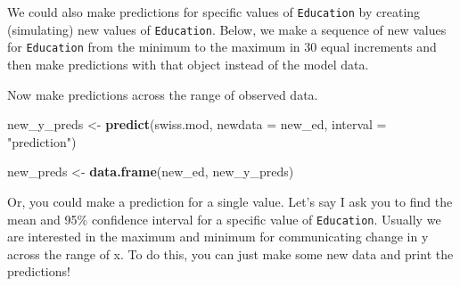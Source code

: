\documentclass[
]{book}
\newenvironment{Shaded}{\begin{snugshade}}{\end{snugshade}}
\newcommand{\DataTypeTok}[1]{\textcolor[rgb]{0.13,0.29,0.53}{#1}}
\newcommand{\DecValTok}[1]{\textcolor[rgb]{0.00,0.00,0.81}{#1}}
\newcommand{\KeywordTok}[1]{\textcolor[rgb]{0.13,0.29,0.53}{\textbf{#1}}}
\newcommand{\NormalTok}[1]{#1}
\newcommand{\OperatorTok}[1]{\textcolor[rgb]{0.81,0.36,0.00}{\textbf{#1}}}
\newcommand{\StringTok}[1]{\textcolor[rgb]{0.31,0.60,0.02}{#1}}
\begin{document}
We could also make predictions for specific values of \texttt{Education} by creating (simulating) new values of \texttt{Education}. Below, we make a sequence of new values for \texttt{Education} from the minimum to the maximum in 30 equal increments and then make predictions with that object instead of the model data.

\begin{Shaded}
\end{Shaded}

Now make predictions across the range of observed data.

\begin{Shaded}
\begin{Highlighting}[]
\NormalTok{new_y_preds <-}\StringTok{ }\KeywordTok{predict}\NormalTok{(swiss.mod, }\DataTypeTok{newdata =}\NormalTok{ new_ed, }\DataTypeTok{interval =} \StringTok{"prediction"}\NormalTok{)}

\NormalTok{new_preds <-}\StringTok{ }\KeywordTok{data.frame}\NormalTok{(new_ed, new_y_preds)}
\end{Highlighting}
\end{Shaded}

Or, you could make a prediction for a single value. Let's say I ask you to find the mean and 95\% confidence interval for a specific value of \texttt{Education}. Usually we are interested in the maximum and minimum for communicating change in y across the range of x. To do this, you can just make some new data and print the predictions!
\end{document}

